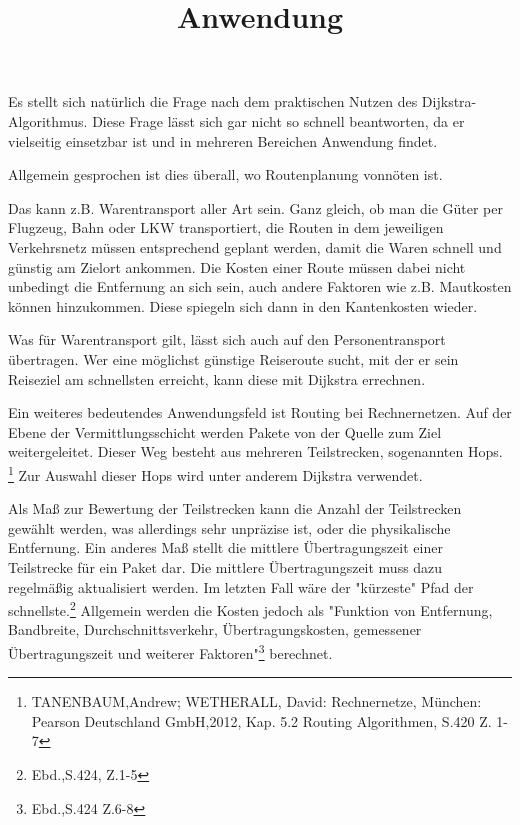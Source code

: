 \documentclass[a4paper,12pt]{article}
\title{Anwendung}
\begin{document}
Es stellt sich natürlich die Frage nach dem praktischen Nutzen des Dijkstra-Algorithmus. Diese Frage lässt sich gar nicht so schnell beantworten, da er vielseitig einsetzbar ist und in mehreren Bereichen Anwendung findet.

\parindent0pt Allgemein gesprochen ist dies überall, wo Routenplanung vonnöten ist.

\parindent0pt
Das kann z.B. Warentransport aller Art sein. Ganz gleich, ob man die Güter per Flugzeug, Bahn oder LKW transportiert, die Routen in dem jeweiligen Verkehrsnetz müssen entsprechend geplant werden, damit die Waren schnell und günstig am Zielort ankommen. Die Kosten einer Route müssen dabei nicht unbedingt die Entfernung an sich sein, auch andere Faktoren wie z.B. Mautkosten können hinzukommen. Diese spiegeln sich dann in den Kantenkosten wieder.

\parindent0pt Was für Warentransport gilt, lässt sich auch auf den Personentransport übertragen. Wer eine möglichst günstige Reiseroute sucht, mit der er sein Reiseziel am schnellsten erreicht, kann diese mit Dijkstra errechnen.

\parindent0pt Ein weiteres bedeutendes Anwendungsfeld ist Routing bei Rechnernetzen. Auf der Ebene der Vermittlungsschicht werden Pakete von der Quelle zum Ziel weitergeleitet. Dieser Weg besteht aus mehreren Teilstrecken, sogenannten Hops. \footnote{TANENBAUM,Andrew; WETHERALL, David: Rechnernetze, München: Pearson Deutschland GmbH,2012, Kap. 5.2 Routing Algorithmen, S.420 Z. 1-7} Zur Auswahl dieser Hops wird unter anderem Dijkstra verwendet. 

\parindent0pt
Als Maß zur Bewertung der Teilstrecken kann die Anzahl der Teilstrecken gewählt werden, was allerdings sehr unpräzise ist, oder die physikalische Entfernung. Ein anderes Maß stellt die mittlere Übertragungszeit einer Teilstrecke für ein Paket dar. Die mittlere Übertragungszeit muss dazu regelmäßig aktualisiert werden. Im letzten Fall wäre der "kürzeste" Pfad der schnellste.\footnote{Ebd.,S.424, Z.1-5}
Allgemein werden die Kosten jedoch als "Funktion von Entfernung, Bandbreite, Durchschnittsverkehr, Übertragungskosten, gemessener Übertragungszeit und weiterer Faktoren"\footnote{Ebd.,S.424 Z.6-8} berechnet.
\end{document}
